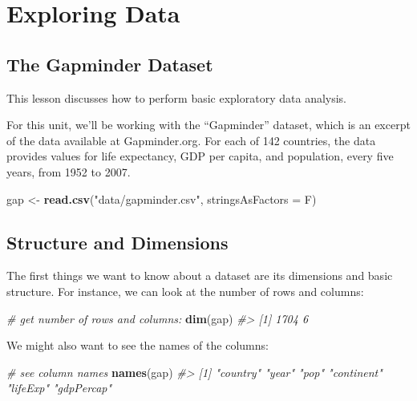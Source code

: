 \documentclass[]{book}
\newenvironment{Shaded}{\begin{snugshade}}{\end{snugshade}}
\newcommand{\CommentTok}[1]{\textcolor[rgb]{0.56,0.35,0.01}{\textit{#1}}}
\newcommand{\DataTypeTok}[1]{\textcolor[rgb]{0.13,0.29,0.53}{#1}}
\newcommand{\KeywordTok}[1]{\textcolor[rgb]{0.13,0.29,0.53}{\textbf{#1}}}
\newcommand{\NormalTok}[1]{#1}
\newcommand{\StringTok}[1]{\textcolor[rgb]{0.31,0.60,0.02}{#1}}
\begin{document}
\hypertarget{exploring-data}{%
\section{Exploring Data}\label{exploring-data}}

\hypertarget{the-gapminder-dataset}{%
\subsection{The Gapminder Dataset}\label{the-gapminder-dataset}}

This lesson discusses how to perform basic exploratory data analysis.

For this unit, we'll be working with the ``Gapminder'' dataset, which is an excerpt of the data available at Gapminder.org. For each of 142 countries, the data provides values for life expectancy, GDP per capita, and population, every five years, from 1952 to 2007.

\begin{Shaded}
\begin{Highlighting}[]
\NormalTok{gap <-}\StringTok{ }\KeywordTok{read.csv}\NormalTok{(}\StringTok{"data/gapminder.csv"}\NormalTok{, }\DataTypeTok{stringsAsFactors =}\NormalTok{ F)}
\end{Highlighting}
\end{Shaded}

\hypertarget{structure-and-dimensions}{%
\subsection{Structure and Dimensions}\label{structure-and-dimensions}}

The first things we want to know about a dataset are its dimensions and basic structure. For instance, we can look at the number of rows and columns:

\begin{Shaded}
\begin{Highlighting}[]
\CommentTok{# get number of rows and columns:}
\KeywordTok{dim}\NormalTok{(gap)}
\CommentTok{#> [1] 1704    6}
\end{Highlighting}
\end{Shaded}

We might also want to see the names of the columns:

\begin{Shaded}
\begin{Highlighting}[]
\CommentTok{# see column names}
\KeywordTok{names}\NormalTok{(gap)}
\CommentTok{#> [1] "country"   "year"      "pop"       "continent" "lifeExp"   "gdpPercap"}
\end{Highlighting}
\end{Shaded}
\end{document}
